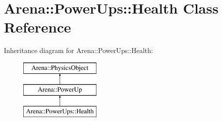 \hypertarget{class_arena_1_1_power_ups_1_1_health}{\section{Arena\+:\+:Power\+Ups\+:\+:Health Class Reference}
\label{class_arena_1_1_power_ups_1_1_health}
}
Inheritance diagram for Arena\+:\+:Power\+Ups\+:\+:Health\+:\begin{figure}[H]
\begin{center}
\leavevmode
\includegraphics[height=3.000000cm]{class_arena_1_1_power_ups_1_1_health}
\end{center}
\end{figure}
